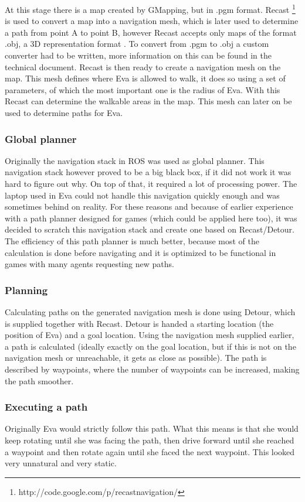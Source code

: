 \documentclass[project_eva.tex]{subfiles}
\begin{document}
At this stage there is a map created by GMapping, but in .pgm format. Recast 
\footnote{http://code.google.com/p/recastnavigation/} is used to convert a map into a navigation mesh, which is later used 
to determine a path from point A to point B, however Recast accepts only maps of the format .obj, a 3D representation 
format \cite{wavefront} . To convert from .pgm to .obj a custom converter had to be written, more information on this can 
be found in the technical document. Recast is then ready to create a navigation mesh on the map. This mesh defines where 
Eva is allowed to walk, it does so using a set of parameters, of which the most important one is the radius of Eva. With 
this Recast can determine the walkable areas in the map. This mesh can later on be used to determine paths for Eva.

\subsubsection*{Global planner}
Originally the navigation stack in ROS was used as global planner. This navigation stack however proved to be a big black 
box, if it did not work it was hard to figure out why. On top of that, it required a lot of processing power. The laptop 
used in Eva could not handle this navigation quickly enough and was sometimes behind on reality. For these reasons and 
because of earlier experience with a path planner designed for games (which could be applied here too), it was decided to 
scratch this navigation stack and create one based on Recast/Detour. The efficiency of this path planner is much better, 
because most of the calculation is done before navigating and it is optimized to be functional in games with many agents 
requesting new paths.

\subsubsection*{Planning}
Calculating paths on the generated navigation mesh is done using Detour, which is supplied together with Recast. Detour is 
handed a starting location (the position of Eva) and a goal location. Using the navigation mesh supplied earlier, a path is 
calculated (ideally exactly on the goal location, but if this is not on the navigation mesh or unreachable, it gets as 
close as possible). The path is described by waypoints, where the number of waypoints can be increased, making the path 
smoother.

\subsubsection*{Executing a path}
Originally Eva would strictly follow this path. What this means is that she would keep rotating until she was facing the 
path, then drive forward until she reached a waypoint and then rotate again until she faced the next waypoint. This looked 
very unnatural and very static. 
\end{document}
